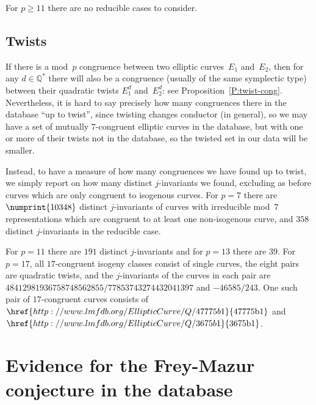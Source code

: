 \documentclass[12pt, reqno]{amsart}
\newcommand{\lmfdbec}[3]{\href{http://www.lmfdb.org/EllipticCurve/Q/#1#2#3}{{\text{\rm#1#2#3}}}}
\newcommand{\Q}{\mathbb{Q}}
\numberwithin{equation}{section}
\theoremstyle{definition}
\theoremstyle{remark}
\begin{document}
For $p\ge11$ there are no reducible cases to consider.

\subsection{Twists}
If there is a mod~$p$ congruence between two elliptic curves~$E_1$
and~$E_2$, then for any $d\in\Q^*$ there will also be a congruence
(usually of the same symplectic type) between their quadratic twists
$E_1^d$ and~$E_2^d$: see Proposition~\ref{P:twist-cong}.
Nevertheless, it is hard to say precisely how many congruences there
in the database ``up to twist'', since twisting changes conductor (in
general), so we may have a set of mutually $7$-congruent elliptic
curves in the database, but with one or more of their twists not in
the database, so the twisted set in our data will be smaller.

Instead, to have a measure of how many congruences we have found up
to twist, we simply report on how many distinct $j$-invariants we
found, excluding as before curves which are only congruent to
isogenous curves.  For $p=7$ there are $\numprint{10348}$ distinct
$j$-invariants of curves with irreducible mod~$7$ representations
which are congruent to at least one non-isogenous curve, and $358$
distinct $j$-invariants in the reducible case.

For $p=11$ there are $191$ distinct $j$-invariants and for $p=13$
there are $39$.  For $p=17$, all $17$-congruent isogeny classes
consist of single curves, the eight pairs are quadratic twists, and
the $j$-invariants of the curves in each pair are
$48412981936758748562855/77853743274432041397$ and $-46585/243$.  One
such pair of $17$-congruent curves consists of $\lmfdbec{47775}{b}{1}$
and~$\lmfdbec{3675}{b}{1}$.

\section{Evidence for the Frey-Mazur conjecture in the database}
\label{S:Frey-Mazur}
\end{document}
